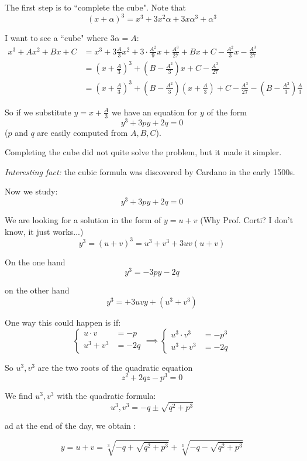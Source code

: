 \documentclass[10pt]{scrartcl}
\begin{document}
The first step is to ``complete the cube". Note that 
\[(x+ \alpha)^3 = x^3 + 3x^2 \alpha + 3x\alpha^3 + \alpha^3\]

I want to see a ``cube" where $3\alpha = A$: 
\[
\begin{aligned}
x^3 + Ax^2 + Bx + C &=   \textstyle{x^3 + 3\frac{A}{3}x^2 + 3\cdot \frac{A^2}{9}x + \frac{A^3}{27} + Bx + C - \frac{A^2}{3}x - \frac{A^3}{27}}\\[0.2cm]
  &= \textstyle{(x + \frac{A}{3})^3 + (B-\frac{A^2}{3})x + C - \frac{A^3}{27}}\\[0.2cm]
  &= \textstyle{(x + \frac{A}{3})^3 + (B - \frac{A^2}{3})(x + \frac{A}{3}) + C - \frac{A^3}{27} - (B-\frac{A^2}{3})\frac{A}{3}}
\end{aligned}
\]

So if we substitute $y = x + \frac{A}{3}$ we have an equation for $y$ of the form \[y^3 + 3py + 2q = 0\]
($p$ and $q$ are easily computed from $A,B,C$). 

Completing the cube did not quite solve the problem, but it made it simpler. 

\emph{Interesting fact:} the cubic formula was discovered by Cardano in the early 1500s.

Now we study:
\[y^3 + 3py + 2q = 0\]

We are looking for a solution in the form of $y = u + v$ (Why Prof. Corti? I don't know, it just works...)
\[y^3 = (u+v)^3 = u^3 + v^3 + 3uv(u+v)\]

On the one hand 
\[y^3 = -3py - 2q\]

on the other hand
\[y^3 = +3uvy + (u^3 + v^3)\]

One way this could happen is if: 
\[
  \begin{cases}
  u \cdot v &= -p\\
  u^3 + v^3 &= -2q	
  \end{cases}
  \implies 
\begin{cases}
u^3 \cdot v^3 &= -p^3\\
u^3 + v^3 &= -2q	
\end{cases}
\]

So $u^3, v^3$ are the two roots of the quadratic equation 
\[z^2 + 2qz -p^3= 0\]

We find $u^3,v^3$ with the quadratic formula: 
\[u^3,v^3 = -q \pm \sqrt{q^2 + p^3}\]

ad at the end of the day, we obtain :

\[y = u+ v = \sqrt[3]{-q + \sqrt{q^2 + p^3}} + \sqrt[3]{-q - \sqrt{q^2 + p^3}}\]
\end{document}
